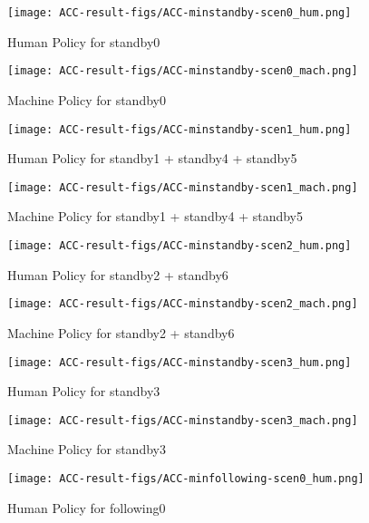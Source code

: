 \begin{figure}[h]
    \texttt{[image: ACC-result-figs/ACC-minstandby-scen0\_hum.png]}
    \caption{Human Policy for standby0}
    \label{fig:standby-s0-hum}
\end{figure}

\begin{figure}[h]
    \texttt{[image: ACC-result-figs/ACC-minstandby-scen0\_mach.png]}
    \caption{Machine Policy for standby0}
    \label{fig:standby-s0-mach}
\end{figure}

\begin{figure}[h]
    \texttt{[image: ACC-result-figs/ACC-minstandby-scen1\_hum.png]}
    \caption{Human Policy for standby1 + standby4 + standby5}
    \label{fig:standby-s1-hum}
\end{figure}

\begin{figure}[h]
    \texttt{[image: ACC-result-figs/ACC-minstandby-scen1\_mach.png]}
    \caption{Machine Policy for standby1 + standby4 + standby5}
    \label{fig:standby-s1-mach}
\end{figure}

\begin{figure}[h]
    \texttt{[image: ACC-result-figs/ACC-minstandby-scen2\_hum.png]}
    \caption{Human Policy for standby2 + standby6}
    \label{fig:standby-s2-hum}
\end{figure}

\begin{figure}[h]
    \texttt{[image: ACC-result-figs/ACC-minstandby-scen2\_mach.png]}
    \caption{Machine Policy for standby2 + standby6}
    \label{fig:standby-s2-mach}
\end{figure}

\begin{figure}[h]
    \texttt{[image: ACC-result-figs/ACC-minstandby-scen3\_hum.png]}
    \caption{Human Policy for standby3}
    \label{fig:standby-s3-hum}
\end{figure}

\begin{figure}[h]
    \texttt{[image: ACC-result-figs/ACC-minstandby-scen3\_mach.png]}
    \caption{Machine Policy for standby3}
    \label{fig:standby-s3-mach}
\end{figure}

\begin{figure}[h]
    \texttt{[image: ACC-result-figs/ACC-minfollowing-scen0\_hum.png]}
    \caption{Human Policy for following0}
    \label{fig:following-s0-hum}
\end{figure}

